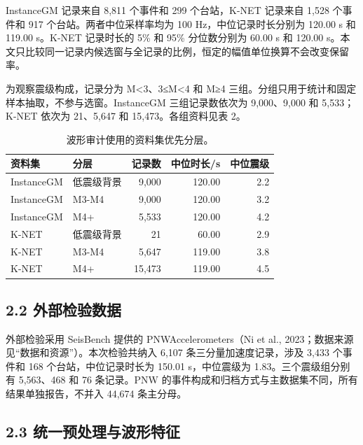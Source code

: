 \documentclass[UTF8,a4paper,zihao=5]{ctexart}
\begin{document}
InstanceGM 记录来自 8,811 个事件和 299 个台站，K-NET 记录来自 1,528 个事件和 917 个台站。两者中位采样率均为 100 Hz，中位记录时长分别为 120.00 s 和 119.00 s。K-NET 记录时长的 5\% 和 95\% 分位数分别为 60.00 s 和 120.00 s。本文只比较同一记录内候选窗与全记录的比例，恒定的幅值单位换算不会改变保留率。

为观察震级构成，记录分为 M\textless3、3≤M\textless4 和 M≥4 三组。分组只用于统计和固定样本抽取，不参与选窗。InstanceGM 三组记录数依次为 9,000、9,000 和 5,533；K-NET 依次为 21、5,647 和 15,473。各组资料见表 2。

\begin{table}[!htbp]
\centering
\caption{波形审计使用的资料集优先分层。}
\label{tab:priority}
\begin{singlespace}
\footnotesize
\setlength{\tabcolsep}{3pt}
\begin{tabular*}{0.76\textwidth}{@{\extracolsep{\fill}}llrrr@{}}
\toprule
资料集 & 分层 & 记录数 & 中位时长/s & 中位震级 \\
\midrule
InstanceGM & 低震级背景 & 9,000 & 120.00 & 2.2 \\
InstanceGM & M3-M4 & 9,000 & 120.00 & 3.2 \\
InstanceGM & M4+ & 5,533 & 120.00 & 4.2 \\
K-NET & 低震级背景 & 21 & 60.00 & 2.9 \\
K-NET & M3-M4 & 5,647 & 119.00 & 3.8 \\
K-NET & M4+ & 15,473 & 119.00 & 4.5 \\
\bottomrule
\end{tabular*}
\end{singlespace}
\end{table}

\subsection*{2.2 外部检验数据}\label{ux5916ux90e8ux68c0ux9a8cux6570ux636e}

外部检验采用 SeisBench 提供的 PNWAccelerometers（Ni et al., 2023；数据来源见``数据和资源''）。本次检验共纳入 6,107 条三分量加速度记录，涉及 3,433 个事件和 168 个台站，中位记录时长为 150.01 s，中位震级为 1.83。三个震级组分别有 5,563、468 和 76 条记录。PNW 的事件构成和归档方式与主数据集不同，所有结果单独报告，不并入 44,674 条主分母。

\subsection*{2.3 统一预处理与波形特征}\label{ux7edfux4e00ux9884ux5904ux7406ux4e0eux6ce2ux5f62ux7279ux5f81}
\end{document}
